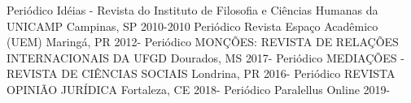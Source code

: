 \begin{cvhonors}
  \cvhonor
    {Periódico}
    {Idéias - Revista do Instituto de Filosofia e Ciências Humanas da UNICAMP}
    {Campinas, SP}
    {2010-2010}
  \cvhonor
    {Periódico}
    {Revista Espaço Acadêmico (UEM)}
    {Maringá, PR}
    {2012-}
  \cvhonor
    {Periódico}
    {MONÇÕES: REVISTA DE RELAÇÕES INTERNACIONAIS DA UFGD}
    {Dourados, MS}
    {2017-}
  \cvhonor
    {Periódico}
    {MEDIAÇÕES - REVISTA DE CIÊNCIAS SOCIAIS}
    {Londrina, PR}
    {2016-}
  \cvhonor
    {Periódico}
    {REVISTA OPINIÃO JURÍDICA}
    {Fortaleza, CE}
    {2018-}
  \cvhonor
    {Periódico}
    {Paralellus}
    {Online}
    {2019-}
\end{cvhonors}
\pagebreak

